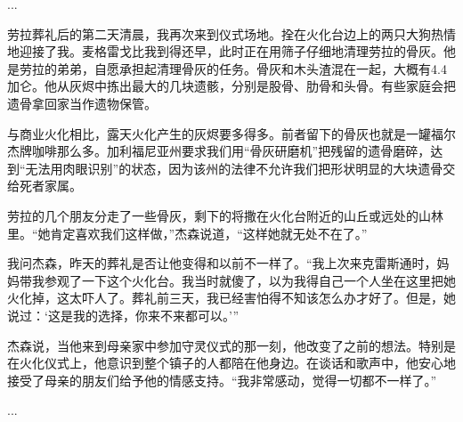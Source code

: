 \documentclass[12pt,oneside]{book}
\begin{document}
\begin{bookref}[frametitle={\cite{好好告别：世界葬礼观察手记}}]
...

劳拉葬礼后的第二天清晨，我再次来到仪式场地。拴在火化台边上的两只大狗热情地迎接了我。麦格雷戈比我到得还早，此时正在用筛子仔细地清理劳拉的骨灰。他是劳拉的弟弟，自愿承担起清理骨灰的任务。骨灰和木头渣混在一起，大概有4.4加仑。他从灰烬中拣出最大的几块遗骸，分别是股骨、肋骨和头骨。有些家庭会把遗骨拿回家当作遗物保管。

与商业火化相比，露天火化产生的灰烬要多得多。前者留下的骨灰也就是一罐福尔杰牌咖啡那么多。加利福尼亚州要求我们用“骨灰研磨机”把残留的遗骨磨碎，达到“无法用肉眼识别”的状态，因为该州的法律不允许我们把形状明显的大块遗骨交给死者家属。

劳拉的几个朋友分走了一些骨灰，剩下的将撒在火化台附近的山丘或远处的山林里。“她肯定喜欢我们这样做，”杰森说道，“这样她就无处不在了。”

我问杰森，昨天的葬礼是否让他变得和以前不一样了。“我上次来克雷斯通时，妈妈带我参观了一下这个火化台。我当时就傻了，以为我得自己一个人坐在这里把她火化掉，这太吓人了。葬礼前三天，我已经害怕得不知该怎么办才好了。但是，她说过：‘这是我的选择，你来不来都可以。’”

杰森说，当他来到母亲家中参加守灵仪式的那一刻，他改变了之前的想法。特别是在火化仪式上，他意识到整个镇子的人都陪在他身边。在谈话和歌声中，他安心地接受了母亲的朋友们给予他的情感支持。“我非常感动，觉得一切都不一样了。”

...

\end{bookref}
\end{document}
